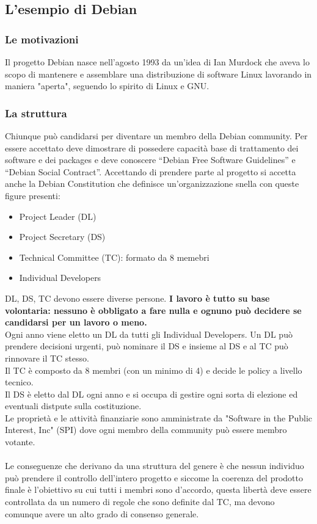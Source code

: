 \subsection{L'esempio di Debian}
\subsubsection{Le motivazioni}
Il progetto Debian nasce nell'agosto 1993 da un'idea di Ian Murdock che aveva lo scopo di mantenere e assemblare una distribuzione di software Linux lavorando in maniera "aperta", seguendo lo spirito di Linux e GNU.
\subsubsection{La struttura}
Chiunque può candidarsi per diventare un membro della Debian community. Per essere accettato deve dimostrare di possedere capacità base di trattamento dei software e dei packages e deve conoscere “Debian Free Software Guidelines” e “Debian Social Contract”.
Accettando di prendere parte al progetto si accetta anche la Debian Constitution che definisce un'organizzazione snella con queste figure presenti:
\begin{itemize}
    \item Project Leader (DL)
    \item Project Secretary (DS)
    \item Technical Committee (TC): formato da 8 memebri
    \item Individual Developers
\end{itemize}
DL, DS, TC devono essere diverse persone. \textbf{I lavoro è tutto su base volontaria: nessuno è obbligato a fare nulla e ognuno può decidere se candidarsi per un lavoro o meno.} \\
Ogni anno viene eletto un DL da tutti gli Individual Developers. Un DL può prendere decisioni urgenti, può nominare il DS e insieme al DS e al TC può rinnovare il TC stesso.\\
Il TC è composto da 8 membri (con un minimo di 4) e decide le policy a livello tecnico. \\
Il DS è eletto dal DL ogni anno e si occupa di gestire ogni sorta di elezione ed eventuali distpute sulla costituzione.\\
Le proprietà e le attività finanziarie sono amministrate da "Software in the Public Interest, Inc" (SPI) dove ogni membro della community può essere membro votante.\\\\
Le conseguenze che derivano da una struttura del genere è che nessun individuo può prendere il controllo dell'intero progetto e siccome la coerenza del prodotto finale è l'obiettivo su cui tutti i membri sono d'accordo, questa libertà deve essere controllata da un numero di regole che sono definite dal TC, ma devono comunque avere un alto grado di consenso generale.\\\\
